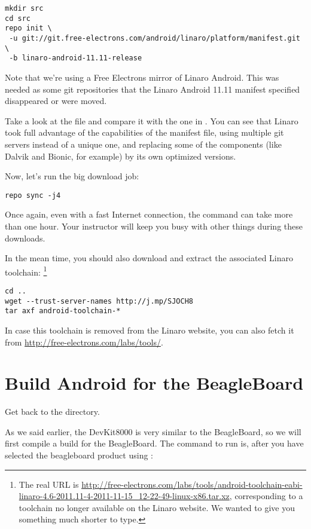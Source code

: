 \begin{verbatim}
mkdir src
cd src
repo init \
 -u git://git.free-electrons.com/android/linaro/platform/manifest.git \
 -b linaro-android-11.11-release
\end{verbatim}

Note that we're using a Free Electrons mirror of Linaro Android. This
was needed as some git repositories that the Linaro Android 11.11 manifest
specified disappeared or were moved. 

Take a look at the  file and compare it with
the one in . You can see that
Linaro took full advantage of the capabilities of the manifest file,
using multiple git servers instead of a unique one, and replacing some
of the components (like Dalvik and Bionic, for example) by its own
optimized versions.

Now, let's run the big download job:
\begin{verbatim}
repo sync -j4
\end{verbatim}

Once again, even with a fast Internet connection, the 
command can take more than one hour. Your instructor will keep you
busy with other things during these downloads.

In the mean time, you should also download and extract the associated
Linaro toolchain: \footnote{The real URL is
  \url{http://free-electrons.com/labs/tools/android-toolchain-eabi-linaro-4.6-2011.11-4-2011-11-15_12-22-49-linux-x86.tar.xz},
  corresponding to a toolchain no longer available on the Linaro
  website. We wanted to give you something much shorter to type.}
\begin{verbatim}
cd ..
wget --trust-server-names http://j.mp/SJOCH8
tar axf android-toolchain-*
\end{verbatim}

In case this toolchain is removed from the Linaro website, you can also
fetch it from \url{http://free-electrons.com/labs/tools/}.

\section{Build Android for the BeagleBoard}

Get back to the  directory.

As we said earlier, the DevKit8000 is very similar to the BeagleBoard,
so we will first compile a build for the BeagleBoard. The command to
run is, after you have selected the beagleboard product using
\code{lunch}:

